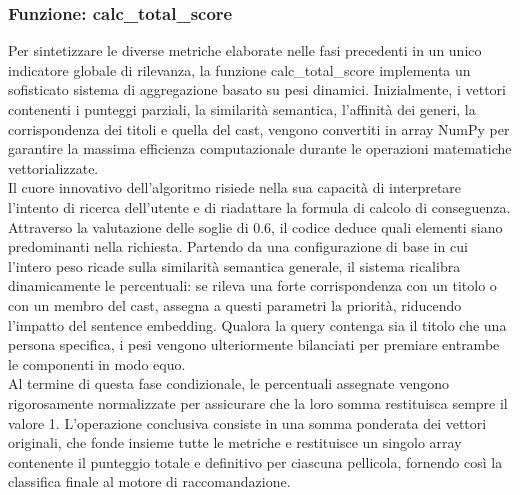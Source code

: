 \documentclass{article}
\begin{document}
\subsubsection{Funzione: calc\_total\_score}
Per sintetizzare le diverse metriche elaborate nelle fasi precedenti in un unico indicatore globale di rilevanza, la funzione calc\_total\_score implementa un sofisticato sistema di aggregazione basato su pesi dinamici. Inizialmente, i vettori contenenti i punteggi parziali, la similarit\`a semantica, l'affinit\`a dei generi, la corrispondenza dei titoli e quella del cast, vengono convertiti in array NumPy per garantire la massima efficienza computazionale durante le operazioni matematiche vettorializzate.\\
Il cuore innovativo dell'algoritmo risiede nella sua capacit\`a di interpretare l'intento di ricerca dell'utente e di riadattare la formula di calcolo di conseguenza. Attraverso la valutazione delle soglie di 0.6, il codice deduce quali elementi siano predominanti nella richiesta. Partendo da una configurazione di base in cui l'intero peso ricade sulla similarit\`a semantica generale, il sistema ricalibra dinamicamente le percentuali: se rileva una forte corrispondenza con un titolo o con un membro del cast, assegna a questi parametri la priorit\`a, riducendo l'impatto del sentence embedding. Qualora la query contenga sia il titolo che una persona specifica, i pesi vengono ulteriormente bilanciati per premiare entrambe le componenti in modo equo.\\
Al termine di questa fase condizionale, le percentuali assegnate vengono rigorosamente normalizzate per assicurare che la loro somma restituisca sempre il valore 1. L'operazione conclusiva consiste in una somma ponderata dei vettori originali, che fonde insieme tutte le metriche e restituisce un singolo array contenente il punteggio totale e definitivo per ciascuna pellicola, fornendo così la classifica finale al motore di raccomandazione.
\end{document}
